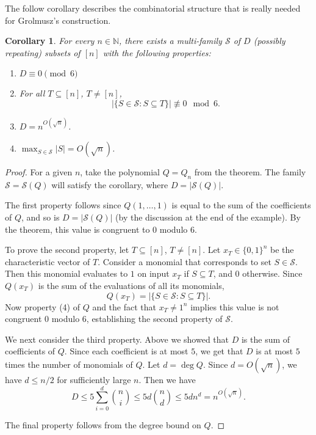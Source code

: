 \documentclass[12pt]{article}
\newtheorem{corollary}[theorem]{Corollary}
\def\N{{\mathbb N}}
\newcommand{\bits}{\{0,1\}}
\newcommand{\calS}{\mathcal{S}}
\begin{document}
The follow corollary describes the combinatorial structure that is really needed
for Grolmusz's construction.
\begin{corollary}\label{cor:sets}
  For every $n\in\N$, there exists a multi-family $\calS$ of $D$ (possibly
  repeating) subsets of $[n]$ with the following properties:
  \begin{enumerate}
    \item $D \equiv 0 \pmod 6$
    \item For all $T\subseteq [n]$, $T\neq [n]$,
      \[
        \left|\{ S \in \calS :  S \subseteq T\}\right| \not\equiv 0
        \mod 6.
      \]
    \item $D = n^{O(\sqrt{n})}$.
    \item $\max_{S \in\calS} |S| = O(\sqrt{n})$.
  \end{enumerate}
\end{corollary}
\begin{proof}

  For a given $n$, take the polynomial $Q = Q_n$ from the theorem.  The family
  $\calS = \calS(Q)$ will satisfy the corollary, where $D = |\calS(Q)|$. 

  The first property follows since $Q(1,\ldots,1)$ is equal to the sum of the
  coefficients of $Q$, and so is $D = |\calS(Q)|$ (by the discussion at the end
  of the example).  By the theorem, this value is congruent to $0$ modulo $6$.

  To prove the second property, let $T\subseteq [n]$, $T\neq [n]$. Let $x_T \in
  \bits^n$ be the characteristic vector of $T$. Consider a monomial that
  corresponds to set $S \in \calS$.  Then this monomial evaluates to $1$
  on input $x_T$ if $S \subseteq T$, and $0$ otherwise. Since $Q(x_T)$ is the
  sum of the
  evaluations of all its monomials,
  \[
    Q(x_T) = \left|\{ S\in \calS :  S \subseteq T\}\right|.
  \]
  Now property (4) of $Q$ and the fact that $x_T \neq 1^n$  implies this value
  is not congruent $0$ modulo $6$, establishing the second property of $\calS$.

  We next consider the third property. Above we showed that $D$ is the
  sum of coefficients of $Q$. Since each coefficient is at most $5$, 
  we get that $D$ is at most $5$ times the number of monomials
  of $Q$. Let $d= \deg Q$. Since $d = O(\sqrt{n})$, we have
  $d \leq n/2$ for sufficiently large $n$. Then we have
  \[
    D \leq 5 \sum_{i=0}^{d} \binom{n}{i} \leq 5d \binom{n}{d}
    \leq 5d n^d = n^{O(\sqrt{n})}.
  \]

  The final property follows from the degree bound on $Q$.
\end{proof}
\end{document}
